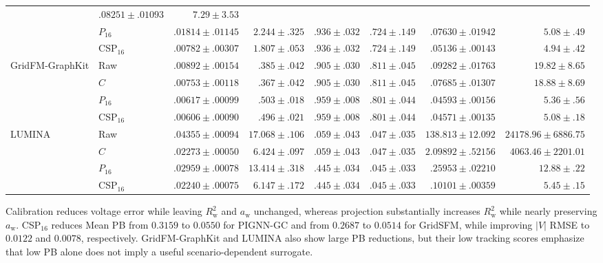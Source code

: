 \documentclass{article}
\begin{document}
\begin{table}[t]
{\begin{tabular}{llrrrrrr}
& $.08251 \pm .01093$
& $7.29 \pm 3.53$ \\
& $P_{16}$
& $.01814 \pm .01145$
& $2.244 \pm .325$
& $.936 \pm .032$
& $.724 \pm .149$
& $.07630 \pm .01942$
& $5.08 \pm .49$ \\
& CSP$_{16}$
& $\mathbf{.00782 \pm .00307}$
& $1.807 \pm .053$
& $.936 \pm .032$
& $.724 \pm .149$
& $\mathbf{.05136 \pm .00143}$
& $\mathbf{4.94 \pm .42}$ \\
\midrule
GridFM-GraphKit
& Raw
& $.00892 \pm .00154$
& $.385 \pm .042$
& $.905 \pm .030$
& $.811 \pm .045$
& $.09282 \pm .01763$
& $19.82 \pm 8.65$ \\
& $C$
& $.00753 \pm .00118$
& $\mathbf{.367 \pm .042}$
& $.905 \pm .030$
& $.811 \pm .045$
& $.07685 \pm .01307$
& $18.88 \pm 8.69$ \\
& $P_{16}$
& $.00617 \pm .00099$
& $.503 \pm .018$
& $\mathbf{.959 \pm .008}$
& $.801 \pm .044$
& $.04593 \pm .00156$
& $5.36 \pm .56$ \\
& CSP$_{16}$
& $\mathbf{.00606 \pm .00090}$
& $.496 \pm .021$
& $\mathbf{.959 \pm .008}$
& $.801 \pm .044$
& $\mathbf{.04571 \pm .00135}$
& $\mathbf{5.08 \pm .18}$ \\
\midrule
LUMINA
& Raw
& $.04355 \pm .00094$
& $17.068 \pm .106$
& $.059 \pm .043$
& $.047 \pm .035$
& $138.813 \pm 12.092$
& $24178.96 \pm 6886.75$ \\
& $C$
& $.02273 \pm .00050$
& $6.424 \pm .097$
& $.059 \pm .043$
& $.047 \pm .035$
& $2.09892 \pm .52156$
& $4063.46 \pm 2201.01$ \\
& $P_{16}$
& $.02959 \pm .00078$
& $13.414 \pm .318$
& $.445 \pm .034$
& $.045 \pm .033$
& $.25953 \pm .02210$
& $12.88 \pm .22$ \\
& CSP$_{16}$
& $\mathbf{.02240 \pm .00075}$
& $\mathbf{6.147 \pm .172}$
& $.445 \pm .034$
& $.045 \pm .033$
& $\mathbf{.10101 \pm .00359}$
& $\mathbf{5.45 \pm .15}$ \\
\bottomrule
\end{tabular}
}
\end{table}
Calibration reduces voltage error while leaving $R_{\mathrm{w}}^2$ and
$a_{\mathrm{w}}$ unchanged, whereas projection substantially increases
$R_{\mathrm{w}}^2$ while nearly preserving $a_{\mathrm{w}}$.
CSP$_{16}$ reduces Mean PB from $0.3159$ to $0.0550$ for PIGNN-GC and
from $0.2687$ to $0.0514$ for GridSFM, while improving $|V|$ RMSE to
$0.0122$ and $0.0078$, respectively. GridFM-GraphKit and LUMINA also
show large PB reductions, but their low tracking scores emphasize that
low PB alone does not imply a useful scenario-dependent surrogate.
\end{document}
